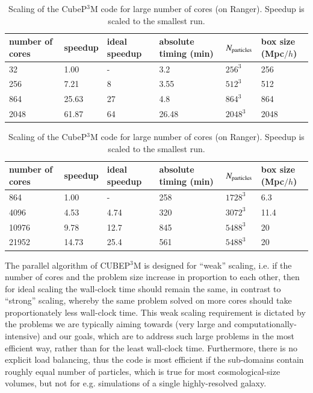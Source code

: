 \begin{table}%
  \vskip -0.5cm 
  \begin{center}
\caption{Scaling of {\small CUBEP$^3$M} on Curie. Speedup is 
scaled to the smallest run.}
\label{summary_scaling_table}
\begin{tabular}{@{}|llllll|}
\hline
number of cores & speedup & ideal speedup & absolute timing (min) & 
$N_{\rm particles}$& box size (Mpc$/h$)
\\[2mm]\hline
32  &  1.00 & - &3.2 & $256^3$ & 256\\
256  & 7.21 & 8 &3.55 & $512^3$  & 512\\
864  & 25.63 & 27 &4.8 & $864^3$  & 864\\
2048  & 61.87 & 64 &26.48 & $2048^3$ & 2048 \\
\hline
\end{tabular}
\caption{Scaling of the CubeP$^3$M code for large number of cores 
(on Ranger). Speedup is scaled to the smallest run.}
\label{summary_scaling_table2}
\begin{tabular}{@{}|llllll|}
\hline
number of cores & speedup & ideal speedup & absolute timing (min) & 
$N_{\rm particles}$& box size (Mpc$/h$)
\\[2mm]\hline
864    & 1.00  & -    &258   & $1728^3$  & 6.3\\
4096   & 4.53  & 4.74 &320   & $3072^3$  & 11.4\\
10976  & 9.78  & 12.7 &845   & $5488^3$  & 20\\
21952  & 14.73 & 25.4 &561   & $5488^3$  & 20 \\
\hline
\end{tabular}
\end{center}
  \vskip -0.7cm 
\end{table}


The parallel algorithm of {\small CUBEP$^3$M} is designed for ``weak'' 
scaling, i.e. if the number of cores and the problem size 
increase in proportion to each other, then for ideal scaling the 
wall-clock time should remain the same, in contrast to ``strong'' 
scaling, whereby the same problem solved on more cores should take 
proportionately less wall-clock time. This weak scaling requirement 
is dictated by the problems we are typically aiming towards (very 
large and computationally-intensive) and our goals, which are to 
address such large problems in the most efficient way, rather than 
for the least wall-clock time. Furthermore, there is no explicit 
load balancing, thus the code is most efficient if the sub-domains
contain roughly equal number of particles, which is true for most
cosmological-size volumes, but not for e.g. simulations of a single
highly-resolved galaxy. 

